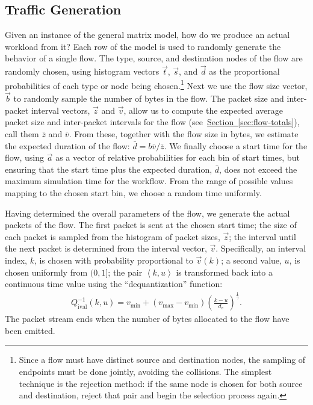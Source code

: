 \documentclass[twocolumn,final]{svjour3}
\newcommand{\Section}[1]{\hyperref[sec:#1]{Section~\ref*{sec:#1}}}
\newcommand{\Di}{Q^{-1}_{\text{ival}}}
\newcommand{\mean}[1]{\bar{#1}}
\newcommand{\seq}[1]{\left<#1\right>}
\newcommand{\fracx}[2]{#1/#2}
\begin{document}
\subsection{Traffic Generation}
\label{sec:traffic-generation}

Given an instance of the general matrix model, how do we produce an actual workload from it? Each row of the model is used to randomly generate the behavior of a single flow. The type, source, and destination nodes of the flow are randomly chosen, using histogram vectors $\vec{t}$, $\vec{s}$, and $\vec{d}$ as the proportional probabilities of each type or node being chosen.\footnote{Since a flow must have distinct source and destination nodes, the sampling of endpoints must be done jointly, avoiding the collisions. The simplest technique is the rejection method: if the same node is chosen for both source and destination, reject that pair and begin the selection process again.}
Next we use the flow size vector, $\vec{b}$ to randomly sample the number of bytes in the flow. The packet size and inter-packet interval vectors, $\vec{z}$ and $\vec{v}$, allow us to compute the expected average packet size and inter-packet intervals for the flow (see~\Section{flow-totals}), call them $\mean{z}$ and $\mean{v}$. From these, together with the flow size in bytes, we estimate the expected duration of the flow: $\mean{d} = \fracx{b\mean{v}}{\mean{z}}$. We finally choose a start time for the flow, using $\vec{a}$ as a vector of relative probabilities for each bin of start times, but ensuring that the start time plus the expected duration, $\mean{d}$, does not exceed the maximum simulation time for the workflow. From the range of possible values mapping to the chosen start bin, we choose a random time uniformly.

Having determined the overall parameters of the flow, we generate the actual packets of the flow. The first packet is sent at the chosen start time; the size of each packet is sampled from the histogram of packet sizes, $\vec{z}$; the interval until the next packet is determined from the interval vector, $\vec{v}$. Specifically, an interval index, $k$, is chosen with probability proportional to $\vec{v}(k)$; a second value, $u$, is chosen uniformly from $(0,1]$; the pair $\seq{k,u}$ is transformed back into a continuous time value using the ``dequantization'' function:
\begin{align}
\label{eqn:interval-dequantization}
\Di(k,u)=v_{\min}+(v_{\max}-v_{\min})\left(\frac{k-u}{d_v}\right)^{\frac{1}{\gamma}}.
\end{align}
The packet stream ends when the number of bytes allocated to the flow have been emitted. %
\end{document}
